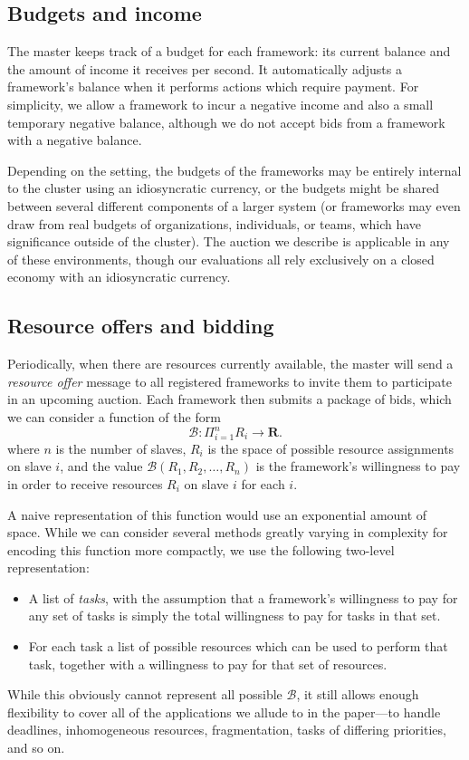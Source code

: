 \documentclass{acm_proc_article-sp}
\begin{document}
\subsection{Budgets and income}
The master keeps track of a budget for each framework: its current balance and
the amount of income it receives per second. It automatically adjusts a
framework's balance when it performs actions which require payment. For simplicity,
we allow a framework to incur a negative income and also a small temporary negative balance, although we do not accept bids from a framework with a negative balance.

Depending on the setting, the budgets of the frameworks may be entirely internal to the cluster
using an idiosyncratic currency,
or the budgets might be shared between several different components of a larger system
(or frameworks may even draw from real budgets of organizations, individuals, or teams,
which have significance outside of the cluster).
The auction we describe is applicable in any of these environments,
though our evaluations all rely exclusively on a closed economy with an idiosyncratic currency.

\subsection{Resource offers and bidding}
Periodically, when there are resources currently available, the master will
send a \emph{resource offer} message to all registered frameworks to invite them
to participate in an upcoming auction. Each framework then submits a package of
bids, which we can consider a function of the form
\[ \mathcal{B}: \Pi_{i=1}^n R_i \rightarrow \mathbf{R}. \]
where $n$ is the number of slaves, 
$R_i$ is the space of possible resource assignments on slave $i$,
and the value $\mathcal{B}\left(R_1, R_2, \ldots, R_n\right)$ is the framework's
willingness to pay in order to receive resources $R_i$ on slave $i$ for each $i$.

A naive representation of this function would use an exponential amount of
space. While we can consider several methods greatly varying in
complexity for encoding this function more compactly, we use the following
two-level representation:
\vspace{-5mm}
\begin{itemize}
\itemsep0em
  \item A list of \emph{tasks}, with the assumption that a framework's
    willingness to pay for any set of tasks is simply the total
    willingness to pay for tasks in that set.
  \item For each task a list of possible resources which can be used to perform
    that task, together with a willingness to pay for that set of resources.
\end{itemize}
\vspace{-5mm}
While this obviously cannot represent all possible $\mathcal{B}$, it still
allows enough flexibility to cover all of the applications we allude to
in the paper---to handle deadlines, inhomogeneous resources, fragmentation,
tasks of differing priorities, and so on.
\end{document}
